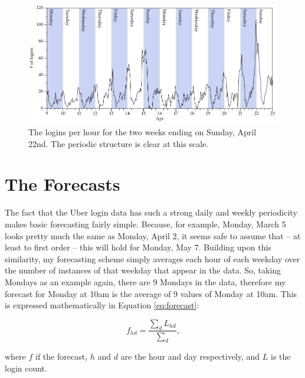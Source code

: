 \documentclass{tufte-handout}
\begin{document}
\begin{figure}[h]
    \includegraphics[width=\linewidth]{logins_per_hour_two_weeks.pdf}%
	\caption{The logins per hour for the two weeks ending on Sunday, April 22nd. The periodic structure is clear at this scale.}%
	\label{fig:lph2week}%
\end{figure}

\section{The Forecasts}

The fact that the Uber login data has such a strong daily and weekly periodicity makes basic forecasting fairly simple. Because, for example, Monday, March 5 looks pretty much the same as Monday, April 2, it seems safe to assume that -- at least to first order -- this will hold for Monday, May 7. Building upon this similarity, my forecasting scheme simply averages each hour of each weekday over the number of instances of that weekday that appear in the data. So, taking Mondays as an example again, there are 9 Mondays in the data, therefore my forecast for Monday at 10am is the average of 9 values of Monday at 10am. This is expressed mathematically in Equation \ref{eq:forecast}:

\begin{equation}
        f_{hd} = \frac{\sum_d L_{hd}}{\sum_d}
        \label{eq:forecast},
\end{equation}

\noindent where $f$ if the forecast, $h$ and $d$ are the hour and day respectively, and $L$ is the login count. 
\end{document}
